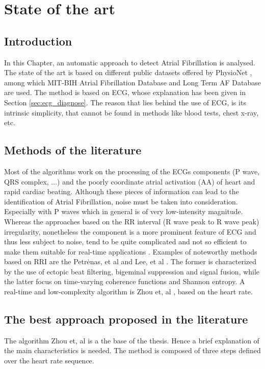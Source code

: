 \chapter{State of the art}
\label{sec:state_of_the_art}

\section{Introduction}
\label{sec:soa_introduction}
In this Chapter, an automatic approach to detect Atrial Fibrillation is analysed. The state of the art is based on different public datasets offered by PhysioNet \cite{physionet}, among which MIT-BIH Atrial Fibrillation Database \cite{afdb} and Long Term AF Database \cite{ltafdb} are used.
The method is based on ECG, whose explanation has been given in Section \ref{sec:ecg_diagnose}. The reason that lies behind the use of ECG, is its intrinsic simplicity, that cannot be found in methods like blood tests, chest x-ray, etc.

\section{Methods of the literature}
Most of the algorithms work on the processing of the ECGs components (P wave, QRS complex, ...) and the poorly coordinate atrial activation (AA) of heart and rapid cardiac beating. Although these pieces of information can lead to the identification of Atrial Fibrillation, noise must be taken into consideration. Especially with P waves which in general is of very low-intensity magnitude. Whereas the approaches based on the RR interval (R wave peak to R wave peak) irregularity, nonetheless the component is a more prominent feature of ECG and thus less subject to noise, tend to be quite complicated and not so efficient to make them suitable for real-time applications \cite[p. 2]{zhou2015}. Examples of noteworthy methods based on RRI are the Petrėnas, et al \cite[2015]{petrenas2015} and Lee, et al \cite[2013]{lee2013}. The former is characterized by the use of ectopic beat filtering, bigeminal suppression and signal fusion, while the latter focus on time-varying coherence functions and Shannon entropy. A real-time and low-complexity algorithm is Zhou et, al \cite{zhou2015}, based on the heart rate. 

\section{The best approach proposed in the literature}
The algorithm Zhou et, al \cite{zhou2015} is a the base of the thesis. Hence a brief explanation of the main characteristics is needed. The method is composed of three steps defined over the heart rate sequence.
